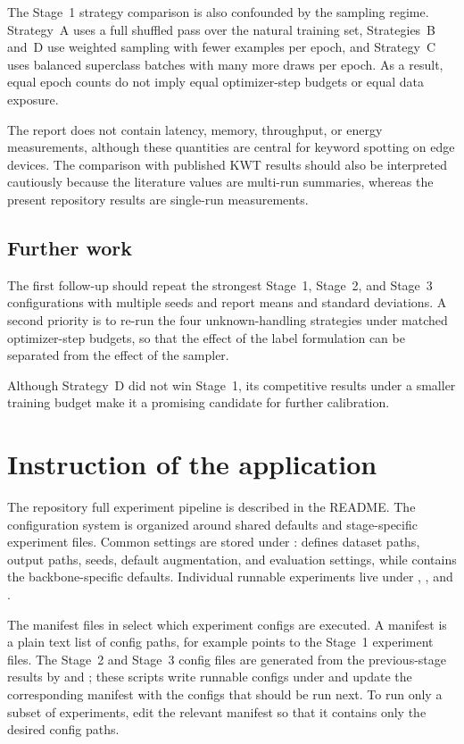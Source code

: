 \documentclass[11pt]{article}
\begin{document}
The Stage~1 strategy comparison is also confounded by the sampling regime. Strategy~A uses a full shuffled pass over the natural training set, Strategies~B and~D use weighted sampling with fewer examples per epoch, and Strategy~C uses balanced superclass batches with many more draws per epoch. As a result, equal epoch counts do not imply equal optimizer-step budgets or equal data exposure.

The report does not contain latency, memory, throughput, or energy measurements, although these quantities are central for keyword spotting on edge devices. The comparison with published KWT results should also be interpreted cautiously because the literature values are multi-run summaries, whereas the present repository results are single-run measurements.

\subsection*{Further work}

The first follow-up should repeat the strongest Stage~1, Stage~2, and Stage~3 configurations with multiple seeds and report means and standard deviations. A second priority is to re-run the four unknown-handling strategies under matched optimizer-step budgets, so that the effect of the label formulation can be separated from the effect of the sampler.

Although Strategy~D did not win Stage~1, its competitive results under a smaller training budget make it a promising candidate for further calibration.

\section{Instruction of the application}
\label{sec:instructions}
The repository full experiment pipeline is described in the README. The configuration system is organized around shared defaults and stage-specific experiment files. Common settings are stored under :  defines dataset paths, output paths, seeds, default augmentation, and evaluation settings, while  contains the backbone-specific defaults. Individual runnable experiments live under , , and . 

The manifest files in  select which experiment configs are executed. A manifest is a plain text list of config paths, for example  points to the Stage~1 experiment files. The Stage~2 and Stage~3 config files are generated from the previous-stage results by  and ; these scripts write runnable configs under  and update the corresponding manifest with the configs that should be run next. To run only a subset of experiments, edit the relevant manifest so that it contains only the desired config paths.
\end{document}
